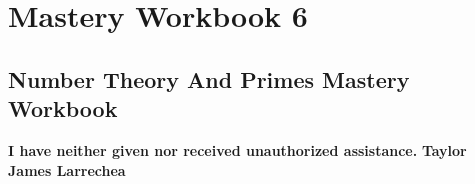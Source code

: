 \clearpage
\chapter{Mastery Workbook 6}

\section{Number Theory And Primes Mastery Workbook}


\begin{center}
    \Large{\textbf{I have neither given nor received unauthorized assistance.}}
    \large{\textbf{Taylor James Larrechea}}
\end{center}

